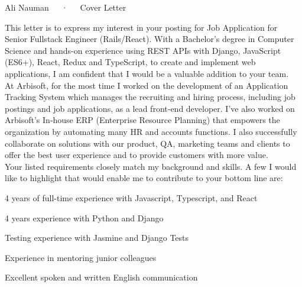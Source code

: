 \documentclass[11pt, a4paper]{awesome-cv}
\begin{document}
\makecvheader[L]

\makecvfooter
  {}
  {Ali Nauman~~~·~~~Cover Letter}
  {}

\makelettertitle

\begin{cvletter}


This letter is to express my interest in your posting for Job Application for Senior Fullstack Engineer (Rails/React). With a Bachelor’s degree in Computer Science and hands-on experience using REST APIs with Django, JavaScript (ES6+), React, Redux and TypeScript, to create and implement web applications, I am confident that I would be a valuable addition to your team.\\

At Arbisoft, for the most time I worked on the development of an Application Tracking System which manages the recruiting and hiring process, including job postings and job applications, as a lead front‐end developer. I’ve also worked on Arbisoft’s In‐house ERP (Enterprise Resource Planning) that empowers the organization by automating many HR and accounts functions. I also successfully collaborate on solutions with our product, QA, marketing teams and clients to offer the best user experience and to provide customers with more value.\\

Your listed requirements closely match my background and skills. A few I would like to highlight that would enable me to contribute to your bottom line are:\\

\begin{cvitems}
\item{4 years of full-time experience with Javascript, Typescript, and React}
\item{4 years experience with Python and Django}
\item{Testing experience with Jasmine and Django Tests}
\item{Experience in mentoring junior colleagues}
\item{Excellent spoken and written English communication }
\\\\
\end{cvitems}


\end{cvletter}
\end{document}
